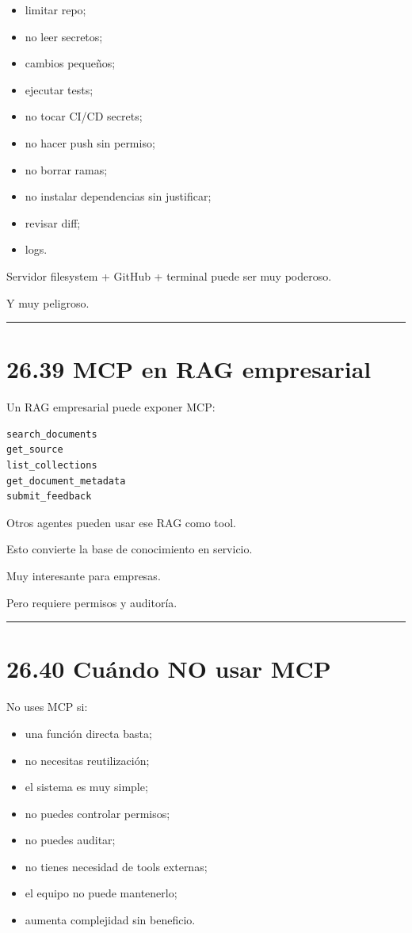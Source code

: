 \begin{itemize}
\tightlist
\item
  limitar repo;
\item
  no leer secretos;
\item
  cambios pequeños;
\item
  ejecutar tests;
\item
  no tocar CI/CD secrets;
\item
  no hacer push sin permiso;
\item
  no borrar ramas;
\item
  no instalar dependencias sin justificar;
\item
  revisar diff;
\item
  logs.
\end{itemize}

Servidor filesystem + GitHub + terminal puede ser muy poderoso.

Y muy peligroso.

\begin{center}\rule{0.5\linewidth}{0.5pt}\end{center}

\section{26.39 MCP en RAG empresarial}\label{mcp-en-rag-empresarial}

Un RAG empresarial puede exponer MCP:

\begin{lstlisting}
search_documents
get_source
list_collections
get_document_metadata
submit_feedback
\end{lstlisting}

Otros agentes pueden usar ese RAG como tool.

Esto convierte la base de conocimiento en servicio.

Muy interesante para empresas.

Pero requiere permisos y auditoría.

\begin{center}\rule{0.5\linewidth}{0.5pt}\end{center}

\section{26.40 Cuándo NO usar MCP}\label{cuuxe1ndo-no-usar-mcp}

No uses MCP si:

\begin{itemize}
\tightlist
\item
  una función directa basta;
\item
  no necesitas reutilización;
\item
  el sistema es muy simple;
\item
  no puedes controlar permisos;
\item
  no puedes auditar;
\item
  no tienes necesidad de tools externas;
\item
  el equipo no puede mantenerlo;
\item
  aumenta complejidad sin beneficio.
\end{itemize}

